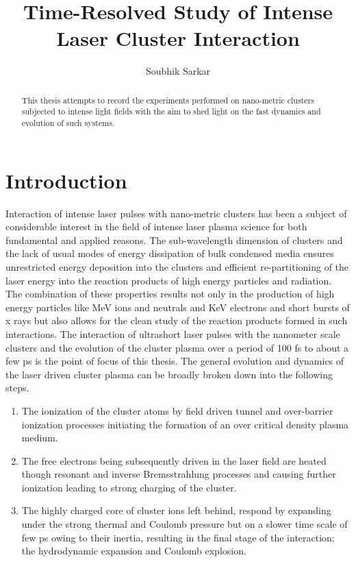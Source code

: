 \documentclass[a4paper,12pt]{article}
\begin{document}
	
	




\title{Time-Resolved Study of Intense Laser Cluster Interaction}
\author{Soubhik Sarkar}
\maketitle
\sloppy
{}


\begin{abstract}
This thesis attempts to record the experiments performed on nano-metric clusters subjected to intense light fields with the aim to shed light on the fast dynamics and evolution of such systems.
\end{abstract}

\section{Introduction}
Interaction of intense laser pulses with nano-metric clusters has been a subject of considerable interest in the field of intense laser plasma science for both fundamental and applied reasons. The sub-wavelength dimension of clusters and the lack of usual modes of energy dissipation of bulk condensed media ensures unrestricted energy deposition into the clusters and efficient re-partitioning of the laser energy into the reaction products of high energy particles and radiation. The combination of these properties results not only in the production of high energy particles like MeV ions\cite{ionditmire} and neutrals\cite{neutralrajeev} and KeV electrons\cite{hotelectronjha,electronassymetryvk} and short bursts of x rays\cite{riju} but also allows for the clean study of the reaction products formed in such interactions. The interaction of ultrashort laser pulses with the nanometer scale clusters and the evolution of the cluster plasma over a period of 100 fs to about a few ps is the point of focus of this thesis. 
The general evolution and dynamics of the laser driven cluster plasma can be broadly broken down into the following steps\cite{revkrainov,revsaalmann,revfennel}. 
\begin{enumerate}
    \item The ionization of the cluster atoms by field driven tunnel and over-barrier ionization processes initiating the formation of an over critical density plasma medium.
    \item The free electrons being subsequently driven in the laser field are heated though resonant and inverse Bremsstrahlung processes and causing further ionization leading to strong charging of the cluster.
    \item The highly charged core of cluster ions left behind, respond by expanding under the strong thermal and Coulomb pressure but on a slower time scale of few ps owing to their inertia, resulting in the final stage of the interaction; the hydrodynamic expansion and Coulomb explosion.
\end{enumerate}
\end{document}
